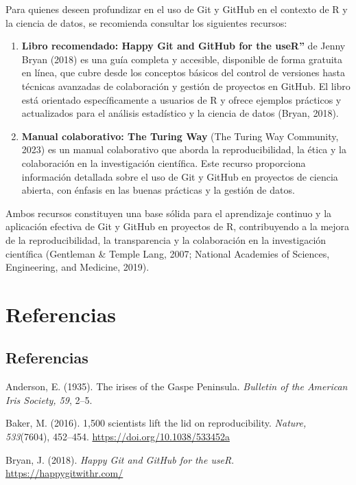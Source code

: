 \documentclass[
  spanish,
  a4paper,
  DIV=11,
  numbers=noendperiod,
  onepage,
  openany]{scrreprt}
\begin{document}
Para quienes deseen profundizar en el uso de Git y GitHub en el contexto
de R y la ciencia de datos, se recomienda consultar los siguientes
recursos:

\begin{enumerate}
\def\labelenumi{\arabic{enumi}.}
\item
  \textbf{Libro recomendado: Happy Git and GitHub for the useR''} de
  Jenny Bryan (2018) es una guía completa y accesible, disponible de
  forma gratuita en línea, que cubre desde los conceptos básicos del
  control de versiones hasta técnicas avanzadas de colaboración y
  gestión de proyectos en GitHub. El libro está orientado
  específicamente a usuarios de R y ofrece ejemplos prácticos y
  actualizados para el análisis estadístico y la ciencia de datos
  (Bryan, 2018).
\item
  \textbf{Manual colaborativo: The Turing Way} (The Turing Way
  Community, 2023) es un manual colaborativo que aborda la
  reproducibilidad, la ética y la colaboración en la investigación
  científica. Este recurso proporciona información detallada sobre el
  uso de Git y GitHub en proyectos de ciencia abierta, con énfasis en
  las buenas prácticas y la gestión de datos.
\end{enumerate}

Ambos recursos constituyen una base sólida para el aprendizaje continuo
y la aplicación efectiva de Git y GitHub en proyectos de R,
contribuyendo a la mejora de la reproducibilidad, la transparencia y la
colaboración en la investigación científica (Gentleman \& Temple Lang,
2007; National Academies of Sciences, Engineering, and Medicine, 2019).

\part{Referencias}


\chapter{Referencias}\label{referencias-1}

Anderson, E. (1935). The irises of the Gaspe Peninsula. \emph{Bulletin
of the American Iris Society, 59}, 2--5.

Baker, M. (2016). 1,500 scientists lift the lid on reproducibility.
\emph{Nature, 533}(7604), 452--454.
\url{https://doi.org/10.1038/533452a}

Bryan, J. (2018). \emph{Happy Git and GitHub for the useR}.
\url{https://happygitwithr.com/}
\end{document}
